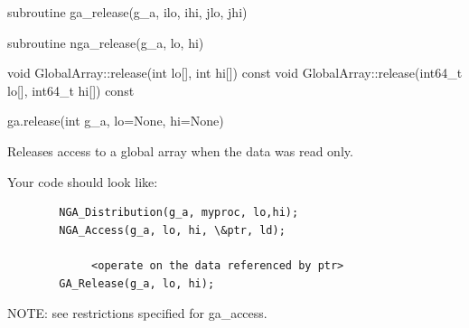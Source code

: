 \documentclass[12pt]{article}
\begin{document}
\begin{f2dapi}
\begin{fcode}
subroutine ga_release(g_a, ilo, ihi, jlo, jhi)
\end{fcode}
\begin{funcargs}
\end{funcargs}
\end{f2dapi}

\begin{fapi}
\begin{fcode}
subroutine nga_release(g_a, lo, hi)
\end{fcode}
\begin{funcargs}
\end{funcargs}
\end{fapi}

\begin{cxxapi}
\begin{cxxcode}
void GlobalArray::release(int lo[], int hi[]) const
void GlobalArray::release(int64_t lo[], int64_t hi[]) const
\end{cxxcode}
\begin{funcargs}
\end{funcargs}
\end{cxxapi}

\begin{pyapi}
\begin{pycode}
ga.release(int g_a, lo=None, hi=None)
\end{pycode}
\begin{funcargs}
\end{funcargs}
\end{pyapi}

\local

\begin{desc}

Releases access to a global array when the data was read only.

Your code should look like:
\begin{verbatim}
        NGA_Distribution(g_a, myproc, lo,hi);
        NGA_Access(g_a, lo, hi, \&ptr, ld);

             <operate on the data referenced by ptr>
        GA_Release(g_a, lo, hi);
\end{verbatim}
NOTE: see restrictions specified for ga_access.

\end{desc}
\end{document}
